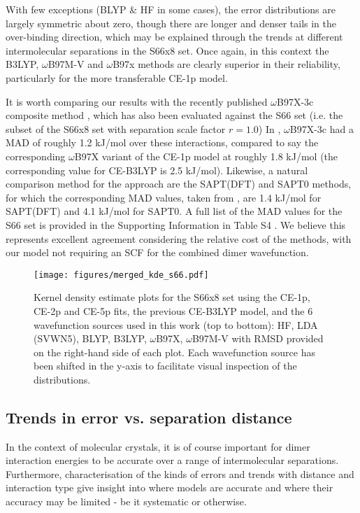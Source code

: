 \documentclass[preprint]{iucr}              %
\begin{document}
With few exceptions (BLYP \& HF in some cases), the error distributions are largely symmetric about zero, though there are 
longer and denser tails in the over-binding direction, which may be explained through the trends at different intermolecular
separations in the S66x8 set. Once again, in this context the B3LYP, $\omega$B97M-V and $\omega$B97x methods are clearly superior 
in their reliability, particularly for the more transferable CE-1p model.

It is worth comparing our results with the recently published $\omega$B97X-3c composite method \cite{Muller2023}, which has
also been evaluated against the S66 set (i.e. the subset of the S66x8 set with separation scale factor $r = 1.0$) 
In \cite{Muller2023}, $\omega$B97X-3c had a MAD of roughly 1.2 kJ/mol over these interactions, compared to say the corresponding
$\omega$B97X variant of the CE-1p model at roughly 1.8 kJ/mol (the corresponding value for CE-B3LYP is 2.5 kJ/mol). Likewise, a natural comparison method for the approach are the SAPT(DFT) and SAPT0 methods, for which the corresponding MAD values, taken from \cite{Xie2022}, are 1.4 kJ/mol for SAPT(DFT) and 4.1 kJ/mol for SAPT0. 
A full list of the MAD values for the S66 set is provided in the Supporting Information in Table S4 %
.
We believe this represents excellent agreement considering the relative cost of the methods, with our model not requiring an SCF
for the combined dimer wavefunction.

\begin{figure}
    \centering
    \texttt{[image: figures/merged\_kde\_s66.pdf]}
    \caption{Kernel density estimate plots for the S66x8 set using the CE-1p, CE-2p and CE-5p fits,
    the previous CE-B3LYP model, and the 6 wavefunction sources used in this work (top to bottom): 
    HF, LDA (SVWN5), BLYP, B3LYP, $\omega$B97X, $\omega$B97M-V with RMSD provided on the right-hand side of each plot. Each 
    wavefunction source has been shifted in the y-axis to facilitate visual inspection of the distributions. }
    \label{fig:kde_s66}
\end{figure}

\subsection{Trends in error vs. separation distance}

In the context of molecular crystals, it is of course important for dimer interaction energies to be accurate over a range 
of intermolecular separations. Furthermore, characterisation of the kinds of errors and trends with distance and interaction 
type give insight into where models are accurate
and where their accuracy may be limited - be it systematic or otherwise.
\end{document}
